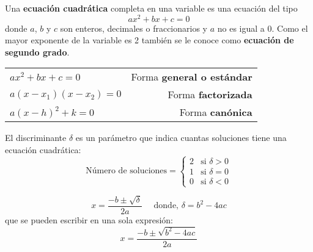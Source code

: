 \begin{tcolorbox}[
        colback=colorrds!5!white,
        colframe=colorrds!35!white,
        coltitle=black,
        fonttitle=\bfseries,
        center title,
        title=Ecuación cuadrática
    ]
    Una \textbf{ecuación cuadrática} completa en una variable es una ecuación del tipo
    \begin{equation}
        ax^2 + bx + c = 0
    \end{equation}
    donde $a$, $b$ y $c$ son enteros, decimales o fraccionarios y $a$ no es igual a 0. Como el
    mayor exponente de la variable es 2 también se
    le conoce como \textbf{ecuación de segundo grado}.
\end{tcolorbox}

\begin{tcolorbox}[
        colback=colorrds!5!white,
        colframe=colorrds!35!white,
        coltitle=black,
        fonttitle=\bfseries,
        center title,
        title=Formas de una ecuación cuadrática
    ]
    \begin{tabular}{lr}
        $ ax^2+bx+c = 0$    & Forma \textbf{general o estándar} \\
        $a(x-x_1)(x-x_2)=0$ & Forma \textbf{factorizada}        \\
        $a(x-h)^2+k=0$      & Forma \textbf{canónica}
    \end{tabular}
\end{tcolorbox}

\begin{tcolorbox}[
        colback=colorrds!5!white,
        colframe=colorrds!35!white,
        coltitle=black,
        fonttitle=\bfseries,
        center title,
        title=Discriminante $\delta$]
    El discriminante $\delta$ es un parámetro que indica cuantas soluciones tiene una ecuación cuadrática:
    \[\text{Número de soluciones}=
        \begin{cases}
            2 & \text{si } \delta > 0 \\
            1 & \text{si } \delta = 0 \\
            0 & \text{si } \delta < 0
        \end{cases}
    \]
\end{tcolorbox}

\begin{tcolorbox}[
        colback=colorrds!5!white,
        colframe=colorrds!35!white,
        coltitle=black,
        fonttitle=\bfseries,
        center title,
        title=Fórmula para las soluciones de una ecuación cuadrática]
    \[
        x = \frac{-b\pm \sqrt{\delta}}{2a} \quad \text{ donde, }\delta=b^2-4ac
    \]
    que se pueden escribir en una sola expresión:
    \[x= \dfrac{-b\pm\sqrt{b^2-4ac}}{2a}\]
\end{tcolorbox}

